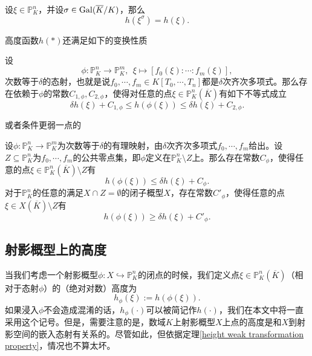 \begin{proposition}
设$\xi\in \mathbb{P}_K^n$，并设$\sigma\in \operatorname{Gal}(\overline{K}/K)$，那么
\begin{equation}
h(\xi^{\sigma}) = h(\xi).
\end{equation}
\end{proposition}

高度函数$h(\ast)$还满足如下的变换性质

\begin{theorem} \label{height transformation property}
设
\begin{equation}
\phi: \mathbb{P}_K^n \longrightarrow \mathbb{P}_K^m, ~~ \xi \mapsto [f_0(\xi):\cdots:f_m(\xi)],
\end{equation}
次数等于$\delta$的态射，也就是说$f_0, \cdots, f_m \in K[T_0,\cdots,T_n]$都是$\delta$次齐次多项式。那么存在依赖于$\phi$的常数$C_{1,\phi},C_{2,\phi}$，使得对任意的点$\xi\in\mathbb{P}^n_K(\overline{K})$有如下不等式成立
\begin{equation}
\delta h(\xi) + C_{1,\phi} \leqslant h(\phi(\xi)) \leqslant \delta h(\xi) + C_{2,\phi}.
\end{equation}
\end{theorem}
或者条件更弱一点的
\begin{theorem} \label{height weak transformation property}
设$\phi: \mathbb{P}_K^n \to \mathbb{P}_K^m$为次数等于$\delta$的有理映射，由$\delta$次齐次多项式$f_0,\cdots,f_m$给出。设$Z\subseteq \mathbb{P}_K^n$为$f_0,\cdots,f_m$的公共零点集，即$\phi$定义在$\mathbb{P}_K^n\setminus Z$上。那么存在常数$C_{\phi}$，使得任意的点$\xi\in\mathbb{P}^n_K(\overline{K}) \setminus Z$有
\begin{equation}
h(\phi(\xi)) \leqslant \delta h(\xi) + C_{\phi}.
\end{equation}
对于$\mathbb{P}^n_K$的任意的满足$X\cap Z = \emptyset$的闭子概型$X$，存在常数$C'_{\phi}$，使得任意的点$\xi\in X(\overline{K}) \setminus Z$有
\begin{equation}
h(\phi(\xi)) \geqslant \delta h(\xi) + C'_{\phi}.
\end{equation}
\end{theorem}

\subsection{射影概型上的高度}
\label{height on projective schemes}
当我们考虑一个射影概型$\phi:X\hookrightarrow\mathbb P^n_K$的闭点的时候，我们定义点$\xi\in\mathbb{P}^n_K(\overline K)$（相对于态射$\phi$）的（绝对对数）高度为
\begin{equation}
h_{\phi}(\xi) := h(\phi(\xi)).
\end{equation}
如果浸入$\phi$不会造成混淆的话，$h_{\phi}(\cdot)$可以被简记作$h(\cdot)$，我们在本文中将一直采用这个记号。但是，需要注意的是，数域$K$上射影概型$X$上点的高度是和$X$到射影空间的嵌入态射有关系的。尽管如此，但依据定理\ref{height weak transformation property}，情况也不算太坏。

